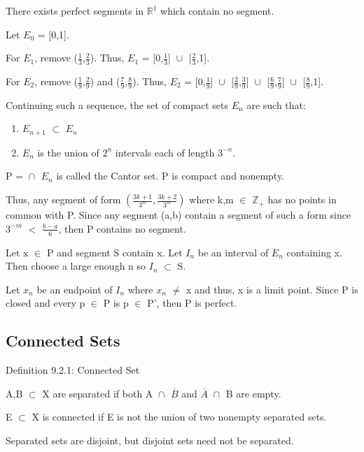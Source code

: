 	\begin{adjustbox}{minipage=14cm, right, vspace=0.1cm 0cm}
		There exists perfect segments in $\mathbb{R}^1$ which contain no segment.

		Let $E_0$ = [0,1].

		For $E_1$, remove ($\frac{1}{3}$,$\frac{2}{3}$).
		Thus, $E_1$ = [0,$\frac{1}{3}$] $\cup_{}^{}$ [$\frac{2}{3}$,1].

		For $E_2$, remove ($\frac{1}{9}$,$\frac{2}{9}$) and ($\frac{7}{9}$,$\frac{8}{9}$).
		Thus, $E_2$ = [0,$\frac{1}{9}$] $\cup_{}^{}$ [$\frac{2}{9}$,$\frac{3}{9}$] $\cup_{}^{}$
		[$\frac{6}{9}$,$\frac{7}{9}$] $\cup_{}^{}$ [$\frac{8}{9}$,1].

		Continuing such a sequence, the set of compact sets $E_n$ are such that:

		\begin{enumerate}[label=(\alph*), leftmargin=2cm, itemsep=0.1cm]
			\item $E_{n+1}$ $\subset$ $E_n$
			\item $E_n$ is the union of $2^n$ intervals each of length $3^{-n}$.
		\end{enumerate}

		P = $\cap_{}^{}$ $E_n$ is called the Cantor set.
		P is compact and nonempty.

		Thus, any segment of form $(\frac{3k+1}{3^m},\frac{3k+2}{3^m})$
		where k,m $\in$ $\mathbb{Z}_+$ has no points in common with P.
		Since any segment (a,b) contain a segment of such a form since
		$3^{-m}$ $<$ $\frac{b-a}{6}$, then P contains no segment.

		Let x $\in$ P and segment S contain x. Let $I_n$ be an interval of
		$E_n$ containing x. Then choose a large enough n so $I_n$ $\subset$ S.
		
		Let $x_n$ be an endpoint of $I_n$ where $x_n$ $\not =$ x and thus,
		x is a limit point. Since P is closed and every p $\in$ P is p $\in$ P',
		then P is perfect.
	\end{adjustbox}





\subsection{ Connected Sets }

{ \color{blue} Definition 9.2.1: Connected Set } 

	\begin{adjustbox}{minipage=14cm, right, vspace=0.1cm 0cm}
		A,B $\subset$ X are separated if both
		A $\cap_{}^{}$ $\overline{B}$ and
		$\overline{A}$ $\cap_{}^{}$ B are empty.

		E $\subset$ X is connected if E is not the union of two nonempty
		separated sets.

		Separated sets are disjoint, but disjoint sets need not be separated. \\
	\end{adjustbox}

